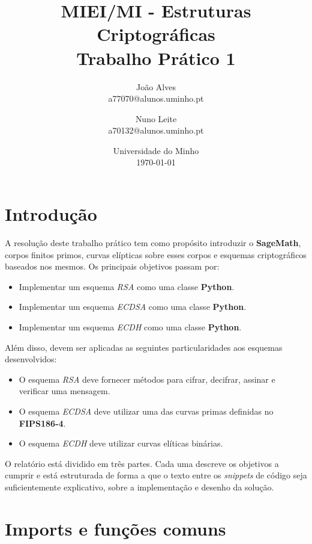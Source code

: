 \documentclass[11pt]{article}
\title{MIEI/MI - Estruturas Criptográficas\\
            \large Trabalho Prático 1}
\author{
        João Alves \\
        a77070@alunos.uminho.pt
        \and
        Nuno Leite \\
        a70132@alunos.uminho.pt
    }
\date{
        Universidade do Minho\\
        \today
    }
\providecommand{\tightlist}{%
      \setlength{\itemsep}{0pt}\setlength{\parskip}{0pt}}
\begin{document}
    
    
    \maketitle
    
    

    \section{Introdução}\label{introduuxe7uxe3o}

    A resolução deste trabalho prático tem como propósito introduzir o
\textbf{SageMath}, corpos finitos primos, curvas elípticas sobre esses
corpos e esquemas criptográficos baseados nos mesmos. Os principais
objetivos passam por:

\begin{itemize}
\tightlist
\item
  Implementar um esquema \emph{RSA} como uma classe \textbf{Python}.
\item
  Implementar um esquema \emph{ECDSA} como uma classe \textbf{Python}.
\item
  Implementar um esquema \emph{ECDH} como uma classe \textbf{Python}.
\end{itemize}

Além disso, devem ser aplicadas as seguintes particularidades aos
esquemas desenvolvidos:

\begin{itemize}
\tightlist
\item
  O esquema \emph{RSA} deve fornecer métodos para cifrar, decifrar,
  assinar e verificar uma mensagem.
\item
  O esquema \emph{ECDSA} deve utilizar uma das curvas primas definidas
  no \textbf{FIPS186-4}.
\item
  O esquema \emph{ECDH} deve utilizar curvas elíticas binárias.
\end{itemize}

O relatório está dividido em três partes. Cada uma descreve os objetivos
a cumprir e está estruturada de forma a que o texto entre os
\emph{snippets} de código seja suficientemente explicativo, sobre a
implementação e desenho da solução.

    \section{Imports e funções
comuns}\label{imports-e-funuxe7uxf5es-comuns}
\end{document}
